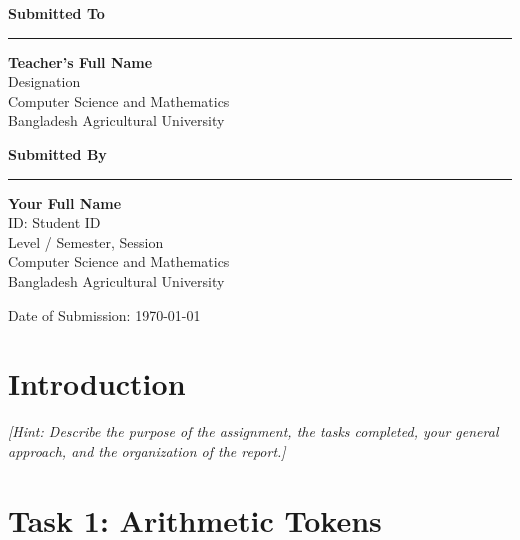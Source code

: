 \documentclass[manuscript,oneside,10pt]{acmart}
\newcommand{\DeptName}{Computer Science and Mathematics}
\newcommand{\SubmissionDate}{\today}
\newcommand{\TeacherName}{Teacher's Full Name}
\newcommand{\TeacherDesignation}{Designation}
\newcommand{\TeacherDept}{\DeptName}
\newcommand{\StudentName}{Your Full Name}
\newcommand{\StudentID}{Student ID}
\newcommand{\StudentSession}{Session}
\newcommand{\StudentSemester}{Level / Semester}
\newcommand{\hint}[1]{{\small\itshape [Hint: #1]}}
\begin{document}
\begin{titlepage}
\begin{minipage}[t]{0.46\textwidth}
  \raggedright
  {\sffamily\bfseries\large Submitted To\par}
  \vspace{3pt}\hrule\vspace{8pt}
  \textbf{\TeacherName}\\[2pt]
  \TeacherDesignation\\[2pt]
  \TeacherDept\\[2pt]
  Bangladesh Agricultural University
\end{minipage}
\hfill
\begin{minipage}[t]{0.46\textwidth}
  \raggedleft
  {\sffamily\bfseries\large Submitted By\par}
  \vspace{3pt}\hrule\vspace{8pt}
  \textbf{\StudentName}\\[2pt]
  ID: \StudentID\\[2pt]
  \StudentSemester, \StudentSession\\[2pt]
  \DeptName\\[2pt]
  Bangladesh Agricultural University
\end{minipage}

\par
\vfill
{\large Date of Submission: \SubmissionDate\par}
\vspace{0.3in}

\end{titlepage}

\setcounter{page}{1}
\maketitle

\section{Introduction}
\hint{Describe the purpose of the assignment, the tasks completed,
your general approach, and the organization of the report.}

\section{Task 1: Arithmetic Tokens}
\end{document}
